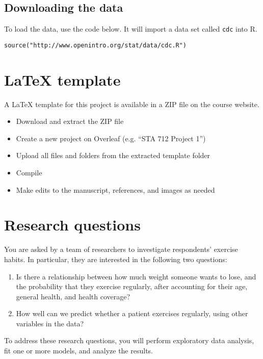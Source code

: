 \documentclass[11pt]{article}
\begin{document}
\subsection*{Downloading the data}

To load the data, use the code below. It will import a data set called \verb;cdc; into R.
\begin{verbatim}
source("http://www.openintro.org/stat/data/cdc.R")
\end{verbatim}

\section*{LaTeX template}

A LaTeX template for this project is available in a ZIP file on the course website.

\begin{itemize}
\item Download and extract the ZIP file
\item Create a new project on Overleaf (e.g. ``STA 712 Project 1'')
\item Upload all files and folders from the extracted template folder
\item Compile
\item Make edits to the manuscript, references, and images as needed
\end{itemize}


\section*{Research questions}

You are asked by a team of researchers to investigate respondents’ exercise habits. In particular, they are interested in the following two questions:
\begin{enumerate}
\item Is there a relationship between how much weight someone wants to lose, and the probability that they exercise regularly, after accounting for their age, general health, and health coverage?

\item How well can we predict whether a patient exercises regularly, using other variables in the data?
\end{enumerate}

\noindent To address these research questions, you will perform exploratory data analysis, fit one or more models, and analyze the results.
\end{document}
